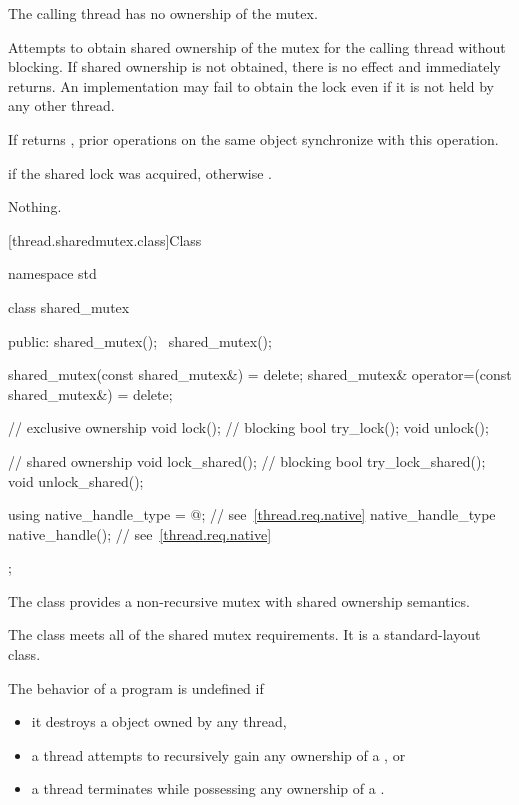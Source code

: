 \begin{itemdescr}
\pnum
\expects
The calling thread has no ownership of the mutex.

\pnum
\effects
Attempts to obtain shared ownership of the mutex for the calling
thread without blocking. If shared ownership is not obtained, there is no
effect and  immediately returns. An implementation
may fail to obtain the lock even if it is not held by any other thread.

\pnum
\sync
If  returns , prior 
operations on the same object synchronize with this
operation.

\pnum
\result
{}

\pnum
\returns
{} if the shared lock was acquired, otherwise .

\pnum
\throws
Nothing.
\end{itemdescr}

[thread.sharedmutex.class]{Class }

%
\begin{codeblock}
namespace std {
  class shared_mutex {
  public:
    shared_mutex();
    ~shared_mutex();

    shared_mutex(const shared_mutex&) = delete;
    shared_mutex& operator=(const shared_mutex&) = delete;

    // exclusive ownership
    void lock();                // blocking
    bool try_lock();
    void unlock();

    // shared ownership
    void lock_shared();         // blocking
    bool try_lock_shared();
    void unlock_shared();

    using native_handle_type = @\impdefnc@;          // see~\ref{thread.req.native}
    native_handle_type native_handle();                         // see~\ref{thread.req.native}
  };
}
\end{codeblock}

\pnum
The class  provides a non-recursive mutex
with shared ownership semantics.

\pnum
The class  meets
all of the shared mutex requirements.
It is a standard-layout class.

\pnum
The behavior of a program is undefined if
\begin{itemize}
\item it destroys a  object owned by any thread,
\item a thread attempts to recursively gain any ownership of a , or
\item a thread terminates while possessing any ownership of a .
\end{itemize}

